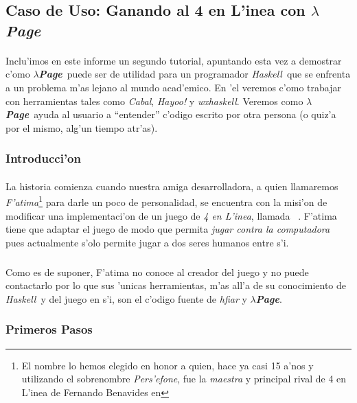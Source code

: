 \documentclass[a4paper]{article}
\newcommand{\haskell}{\textsl{Haskell}}
\newcommand{\hpage}{\textbf{\textsl{$\lambda$Page}}}
\newcommand{\cabal}{\textsl{Cabal}}
\begin{document}
\newpage
\subsection{Caso de Uso: Ganando al 4 en L'inea con \hpage}
\begin{epigraphs}
\end{epigraphs}
\paragraph{}Inclu'imos en este informe un segundo tutorial, apuntando esta vez a demostrar c'omo \hpage\ puede ser de utilidad para un programador \haskell\ que se enfrenta a un problema m'as lejano al mundo acad'emico.  En 'el veremos c'omo trabajar con herramientas tales como \cabal, \textsl{Hayoo!} y \textsl{wxhaskell}.  Veremos como \hpage\ ayuda al usuario a ``entender'' c'odigo escrito por otra persona (o quiz'a por el mismo, alg'un tiempo atr'as).
\subsubsection{Introducci'on}
\paragraph{}La historia comienza cuando nuestra amiga desarrolladora, a quien llamaremos \textsl{F'atima}\footnote{El nombre lo hemos elegido en honor a quien, hace ya casi 15 a'nos y utilizando el sobrenombre \textsl{Pers'efone}, fue la \textsl{maestra} y principal rival de 4 en L'inea de Fernando Benavides en } para darle un poco de personalidad, se encuentra con la misi'on de modificar una implementaci'on de un juego de \textsl{4 en L'inea}, llamada ~\cite{hfiar}.  F'atima tiene que adaptar el juego de modo que permita \textsl{jugar contra la computadora} pues actualmente s'olo permite jugar a dos seres humanos entre s'i.
\subparagraph{}Como es de suponer, F'atima no conoce al creador del juego y no puede contactarlo por lo que sus 'unicas herramientas, m'as all'a de su conocimiento de \haskell\ y del juego en s'i, son el c'odigo fuente de \textsl{hfiar} y \hpage.

\subsubsection{Primeros Pasos}
\end{document}
